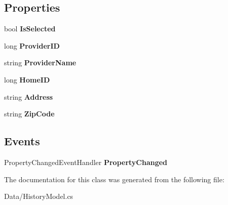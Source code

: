 \subsection*{Properties}
\begin{DoxyCompactItemize}
\item 
\mbox{\label{class_a_f_h___scheduler_1_1_data_1_1_history_model_ae30cb42ce5e235b1a9c3b6c42d470397}} 
bool {\bfseries Is\+Selected}\hspace{0.3cm}{\ttfamily  [get, set]}
\item 
\mbox{\label{class_a_f_h___scheduler_1_1_data_1_1_history_model_aa3679ad423d5f792d2f8acf6b03b5f08}} 
long {\bfseries Provider\+ID}\hspace{0.3cm}{\ttfamily  [get, set]}
\item 
\mbox{\label{class_a_f_h___scheduler_1_1_data_1_1_history_model_ae97255d3af4c8b867e01233537fd71bd}} 
string {\bfseries Provider\+Name}\hspace{0.3cm}{\ttfamily  [get, set]}
\item 
\mbox{\label{class_a_f_h___scheduler_1_1_data_1_1_history_model_a08281f92580491e4e568f50e8edc4080}} 
long {\bfseries Home\+ID}\hspace{0.3cm}{\ttfamily  [get, set]}
\item 
\mbox{\label{class_a_f_h___scheduler_1_1_data_1_1_history_model_a5aa81503370c972bdf077ce91e1f2b57}} 
string {\bfseries Address}\hspace{0.3cm}{\ttfamily  [get, set]}
\item 
\mbox{\label{class_a_f_h___scheduler_1_1_data_1_1_history_model_a53270376689afca58793e19e743cd13a}} 
string {\bfseries Zip\+Code}\hspace{0.3cm}{\ttfamily  [get, set]}
\end{DoxyCompactItemize}
\subsection*{Events}
\begin{DoxyCompactItemize}
\item 
\mbox{\label{class_a_f_h___scheduler_1_1_data_1_1_history_model_a1ee792f388ce6ecd52217cd764f4fc41}} 
Property\+Changed\+Event\+Handler {\bfseries Property\+Changed}
\end{DoxyCompactItemize}


The documentation for this class was generated from the following file\+:\begin{DoxyCompactItemize}
\item 
Data/History\+Model.\+cs\end{DoxyCompactItemize}
